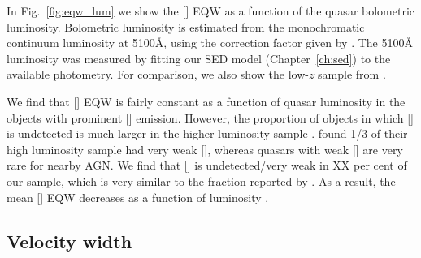 In Fig.~\ref{fig:eqw_lum} we show the [] \ac{EQW} as a function of the quasar bolometric luminosity. 
Bolometric luminosity is estimated from the monochromatic continuum luminosity at 5100\AA, using the correction factor given by \citet{richards06}. 
The 5100\AA\, luminosity was measured by fitting our \ac{SED} model (Chapter~\ref{ch:sed}) to the available photometry. 
For comparison, we also show the low-$z$ sample from \citet{shen11}.  

We find that [] \ac{EQW} is fairly constant as a function of quasar luminosity in the objects with prominent [] emission. 
However, the proportion of objects in which [] is undetected is much larger in the higher luminosity sample \citep[e.g.][]{netzer04}. 
\citet{netzer04} found 1/3 of their high luminosity sample had very weak [], whereas quasars with weak [] are very rare for nearby \ac{AGN}. 
We find that [] is undetected/very weak in XX per cent of our sample, which is very similar to the fraction reported by \citet{netzer04}.  
As a result, the mean [] \ac{EQW} decreases as a function of luminosity \citep[e.g.][]{brotherton96,netzer04,sulentic04,baskin05b}. 

\subsection{Velocity width}

